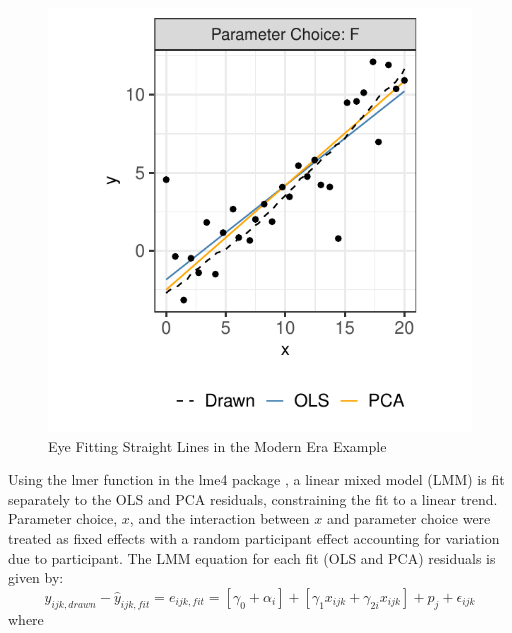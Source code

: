 \documentclass[12pt]{article}
\begin{document}
\begin{figure}[tbp]

{\centering \includegraphics[width=0.65\linewidth,]{Eye-Fitting-Stright-Lines-in-the-Modern-Era_files/figure-latex/eyefitting-example-plot-1} 

}

\caption{Eye Fitting Straight Lines in the Modern Era Example}\label{fig:eyefitting-example-plot}
\end{figure}

Using the lmer function in the lme4 package \citep{lme4}, a linear mixed
model (LMM) is fit separately to the OLS and PCA residuals, constraining
the fit to a linear trend. Parameter choice, \(x\), and the interaction
between \(x\) and parameter choice were treated as fixed effects with a
random participant effect accounting for variation due to participant.
The LMM equation for each fit (OLS and PCA) residuals is given by:
\begin{equation}
y_{ijk,drawn} - \hat y_{ijk,fit} = e_{ijk,fit} = \left[\gamma_0 + \alpha_i\right] + \left[\gamma_{1} x_{ijk} + \gamma_{2i} x_{ijk}\right] + p_{j} + \epsilon_{ijk}
\end{equation} \noindent where
\end{document}
